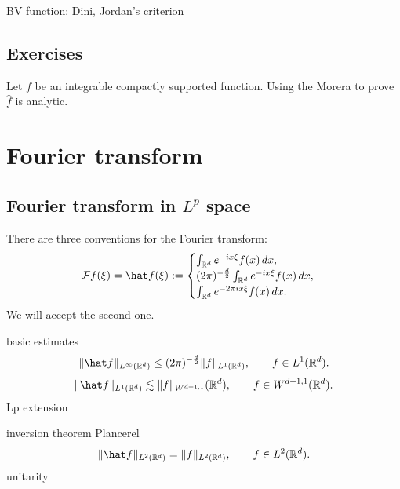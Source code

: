 \documentclass{../../large}
\begin{document}
BV function: Dini, Jordan's criterion
\begin{prb}
\end{prb}





\section*{Exercises}
\begin{prb}
\end{prb}
\begin{prb}
\end{prb}

\begin{prb}
Let $f$ be an integrable compactly supported function.
Using the Morera to prove $\hat f$ is analytic.

\end{prb}









\chapter{Fourier transform}
\section{Fourier transform in $L^p$ space}
There are three conventions for the Fourier transform:
\[\cF f(\xi)=\hat f(\xi):=\begin{cases}
\int_{\R^d}e^{-ix\xi}f(x)\,dx,\\
(2\pi)^{-\frac d2}\int_{\R^d}e^{-ix\xi}f(x)\,dx,\\
\int_{\R^d}e^{-2\pi ix\xi}f(x)\,dx.
\end{cases}\]
We will accept the second one.


\begin{prb}
basic estimates
\[\|\hat f\|_{L^\infty(\R^d)}\le(2\pi)^{-\frac d2}\|f\|_{L^1(\R^d)},\qquad f\in L^1(\R^d).\]
\[\|\hat f\|_{L^1(\R^d)}\lesssim\|f\|_{W^{d+1,1}}(\R^d),\qquad f\in W^{d+1,1}(\R^d).\]
Lp extension
\end{prb}

\begin{prb}
inversion theorem
Plancerel
\[\|\hat f\|_{L^2(\R^d)}=\|f\|_{L^2(\R^d)},\qquad f\in L^2(\R^d).\]
unitarity
\end{prb}
\end{document}
